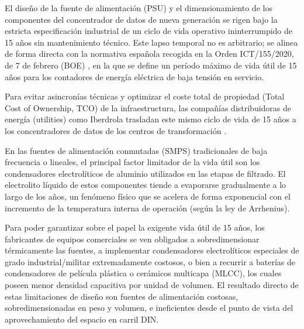 El diseño de la fuente de alimentación (PSU) y el dimensionamiento de los componentes del concentrador de datos de nueva generación se rigen bajo la estricta especificación industrial de un ciclo de vida operativo ininterrumpido de 15 años sin mantenimiento técnico. Este lapso temporal no es arbitrario; se alinea de forma directa con la normativa española recogida en la Orden ICT/155/2020, de 7 de febrero (BOE) \cite{BOE_ICT155_2020}, en la que se define un período máximo de vida útil de 15 años para los contadores de energía eléctrica de baja tensión en servicio. 


Para evitar asincronías técnicas y optimizar el coste total de propiedad (Total Cost of Ownership, TCO) de la infraestructura, las compañías distribuidoras de energía (utilities) como Iberdrola trasladan este mismo ciclo de vida de 15 años a los concentradores de datos de los centros de transformación \cite{WorldBank_AMI_Survey}.

En las fuentes de alimentación conmutadas (SMPS) tradicionales de baja frecuencia o lineales, el principal factor limitador de la vida útil son los condensadores electrolíticos de aluminio utilizados en las etapas de filtrado. El electrolito líquido de estos componentes tiende a evaporarse gradualmente a lo largo de los años, un fenómeno físico que se acelera de forma exponencial con el incremento de la temperatura interna de operación (según la ley de Arrhenius).

Para poder garantizar sobre el papel la exigente vida útil de 15 años, los fabricantes de equipos comerciales se ven obligados a sobredimensionar térmicamente las fuentes, a implementar condensadores electrolíticos especiales de grado industrial/militar extremadamente costosos, o bien a recurrir a baterías de condensadores de película plástica o cerámicos multicapa (MLCC), los cuales poseen menor densidad capacitiva por unidad de volumen. El resultado directo de estas limitaciones de diseño son fuentes de alimentación costosas, sobredimensionadas en peso y volumen, e ineficientes desde el punto de vista del aprovechamiento del espacio en carril DIN.

